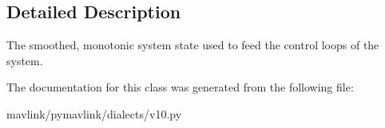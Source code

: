 \subsection{Detailed Description}
\begin{DoxyVerb}The smoothed, monotonic system state used to feed the control
loops of the system.
\end{DoxyVerb}
 

The documentation for this class was generated from the following file\+:\begin{DoxyCompactItemize}
\item 
mavlink/pymavlink/dialects/v10.\+py\end{DoxyCompactItemize}
